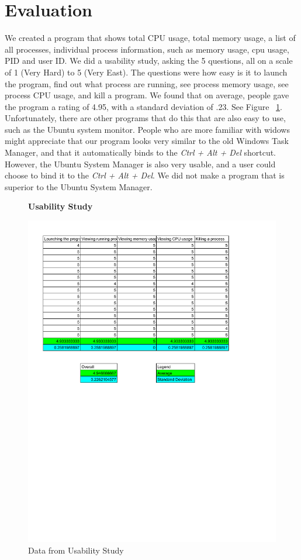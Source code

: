 \documentclass[12pt]{article}
\begin{document}
	\section{Evaluation}
	We created a program that shows total CPU usage, total memory usage, a list of all processes, individual process information, such as memory usage, cpu usage, PID and user ID. We did a usability study, asking the 5 questions, all on a scale of 1 (Very Hard) to 5 (Very East). The questions were how easy is it to launch the program, find out what process are running, see process memory usage, see process CPU usage, and kill a program. We found that on average, people gave the program a rating of 4.95, with a standard deviation of .23. See Figure ~\ref{figUsage}. Unfortunately, there are other programs that do this that are also easy to use, such as the Ubuntu system monitor. People who are more familiar with widows might appreciate that our program looks very similar to the old Windows Task Manager, and that it automatically binds to the \emph{Ctrl + Alt + Del} shortcut. However, the Ubuntu System Manager is also very usable, and a user could choose to bind it to the \emph{Ctrl + Alt + Del}. We did not make a program that is superior to the Ubuntu System Manager.
	\begin{figure}[h!]
		\centering
		\textbf{Usability Study}\par\medskip
		\includegraphics[scale=.7]{usageStudy}
		\caption{Data from Usability Study}
		\label{figUsage}
	\end{figure}
	
\end{document}

